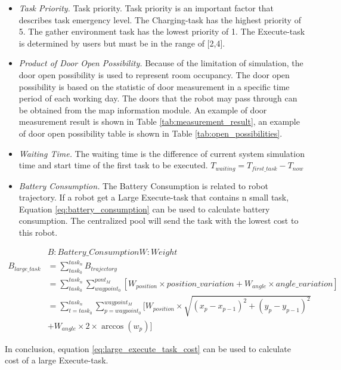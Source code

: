\begin{itemize}
\item \textsl{Task Priority.} Task priority. Task priority is an important factor that describes task emergency level. The Charging-task has the highest priority of 5. The gather environment task has the lowest priority of 1. 
	The Execute-task is determined by users but must be in the range of [2,4]. 
\item \textsl{Product of Door Open Possibility.} Because of the limitation of simulation, the door open possibility is used to represent room occupancy. The door open possibility is based on the statistic of door measurement in a specific time period of each working day. 
	The doors that the robot may pass through can be obtained from the map information module.
	An example of door measurement result is shown in Table \ref{tab:measurement_result}, an example of door open possibility table is shown in Table \ref{tab:open_possibilities}. 
\item \textsl{Waiting Time. } The waiting time is the difference of current system simulation time and start time of the first task to be executed. $T_{waiting} = T_{first\_task} - T_{now}$
\item \textsl{Battery Consumption.} The Battery Consumption is related to robot trajectory. If a robot get a Large Execute-task that contains n small task, Equation \ref{eq:battery_consumption} can be used to calculate battery consumption. The centralized pool will send the task with the lowest cost to this robot.
\end{itemize}
\begin{equation}
\begin{aligned}
\label{eq:battery_consumption}
&B: Battery\_Consumption W: Weight\\
B_{large\_task} & = \sum_{task_0}^{task_n} B_{trajectory} \\
& = \sum_{task_0}^{task_n} \sum_{waypoint_0}^{pont_M} [W_{position} \times position\_variation+W_{angle}  \times angle\_variation]\\
& = \sum_{t = task_0}^{task_n} \sum_{p = waypoint_0}^{waypoint_M} [ W_{position} \times \sqrt{(x_p-x_{p-1} )^2+(y_p-y_{p-1} )^2} \\
&   + W_{angle} \times 2 \times \arccos(w_p)] 
\end{aligned}
\end{equation}

In conclusion, equation \ref{eq:large_execute_task_cost} can be used to calculate cost of a large Execute-task.

